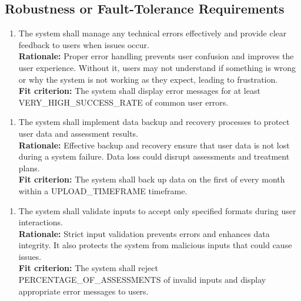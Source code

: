 \documentclass[12pt]{article}
\begin{document}
\subsection{Robustness or Fault-Tolerance Requirements}
\begin{enumerate}[label={PR-RFT}1. ]
  \item The system shall manage any technical errors effectively and provide clear feedback to users when issues occur.\\
  \textbf{Rationale: }Proper error handling prevents user confusion and improves the user experience. Without it, users may not understand if something is wrong or why the system is not working as they expect, leading to frustration.\\
  \textbf{Fit criterion: }The system shall display error messages for at least VERY\_HIGH\_SUCCESS\_RATE of common user errors.  
\end{enumerate}
\begin{enumerate}[label={PR-RFT}2. ]
  \item The system shall implement data backup and recovery processes to protect user data and assessment results.\\
  \textbf{Rationale: }Effective backup and recovery ensure that user data is not lost during a system failure. Data loss could disrupt assessments and treatment plans.\\
  \textbf{Fit criterion: }The system shall back up data on the first of every month within a UPLOAD\_TIMEFRAME timeframe.  
\end{enumerate}
\begin{enumerate}[label={PR-RFT}3. ]
  \item The system shall validate inputs to accept only specified formats during user interactions.\\
  \textbf{Rationale: }Strict input validation prevents errors and enhances data integrity. It also protects the system from malicious inputs that could cause issues.\\
  \textbf{Fit criterion: }The system shall reject PERCENTAGE\_OF\_ASSESSMENTS of invalid inputs and display appropriate error messages to users.  
\end{enumerate}
\end{document}

